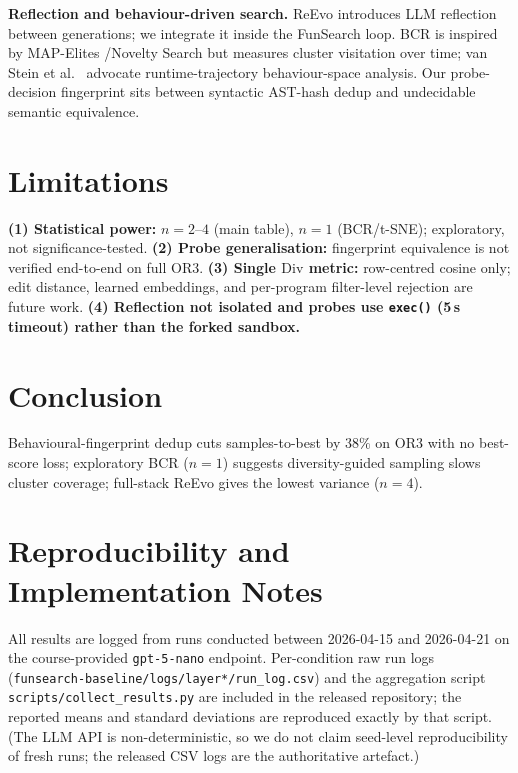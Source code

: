 \documentclass{article}
\begin{document}
\textbf{Reflection and behaviour-driven search.} ReEvo \citep{ye2024reevo}
introduces LLM reflection between generations; we integrate it inside the
FunSearch loop. BCR is inspired by MAP-Elites
\citep{mouret2015illuminating}/Novelty Search \citep{lehman2011novelty} but
measures cluster visitation over time; van Stein et al.~\citep{vanstein2025llm}
advocate runtime-trajectory behaviour-space analysis. Our probe-decision
fingerprint sits between syntactic AST-hash dedup and undecidable semantic
equivalence.

\section{Limitations}
\label{sec:lim}

\textbf{(1) Statistical power:} $n{=}2$--$4$ (main table), $n{=}1$ (BCR/t-SNE);
exploratory, not significance-tested. \textbf{(2) Probe generalisation:}
fingerprint equivalence is not verified end-to-end on full OR3. \textbf{(3)
Single $\mathrm{Div}$ metric:} row-centred cosine only; edit distance, learned
embeddings, and per-program filter-level rejection are future work. \textbf{(4)
Reflection not isolated and probes use \texttt{exec()} (5\,s timeout) rather
than the forked sandbox.}

\section{Conclusion}
\label{sec:conc}

Behavioural-fingerprint dedup cuts samples-to-best by $38\%$ on OR3 with no
best-score loss; exploratory BCR ($n{=}1$) suggests diversity-guided sampling
slows cluster coverage; full-stack ReEvo gives the lowest variance ($n{=}4$).




\appendix

\section{Reproducibility and Implementation Notes}
\label{app:repro}

All results are logged from runs conducted between 2026-04-15 and 2026-04-21 on
the course-provided \texttt{gpt-5-nano} endpoint. Per-condition raw run logs
(\texttt{funsearch-baseline/logs/layer*/run\_log.csv}) and the aggregation
script \texttt{scripts/collect\_results.py} are included in the released
repository; the reported means and standard deviations are reproduced exactly
by that script. (The LLM API is non-deterministic, so we do not claim
seed-level reproducibility of fresh runs; the released CSV logs are the
authoritative artefact.)
\end{document}
